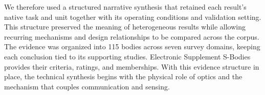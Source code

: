 %
%
%
%
%
%
%
%

We therefore used a structured narrative synthesis that retained each result's
native task and unit together with its operating conditions and validation
setting. This structure preserved the meaning of heterogeneous results while
allowing recurring mechanisms and design relationships to be compared across
the corpus. The evidence was organized into 115 bodies across seven survey
domains, keeping each conclusion tied to its supporting studies. Electronic
Supplement S-Bodies provides their criteria, ratings, and memberships. With
this evidence structure in place, the technical synthesis begins with the
physical role of optics and the mechanism that couples communication and
sensing.
